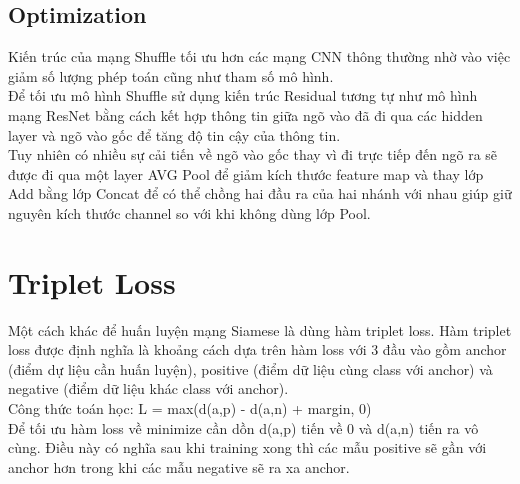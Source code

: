 \documentclass[11pt,a4paper]{article}
\begin{document}
	\subsection{Optimization}
	Kiến trúc của mạng Shuffle tối ưu hơn các mạng CNN thông thường nhờ vào việc giảm số lượng phép toán cũng như tham số mô hình.\\
	Để tối ưu mô hình Shuffle sử dụng kiến trúc Residual tương tự như mô hình mạng ResNet bằng cách kết hợp thông tin giữa ngõ vào đã đi qua các hidden layer và ngõ vào gốc để tăng độ tin cậy của thông tin.\\
	Tuy nhiên có nhiều sự cải tiến về ngõ vào gốc thay vì đi trực tiếp đến ngõ ra sẽ được đi qua một layer AVG Pool để giảm kích thước feature map và thay lớp Add bằng lớp Concat để có thể chồng hai đầu ra của hai nhánh với nhau giúp giữ nguyên kích thước channel so với khi không dùng lớp Pool.
	\section{Triplet Loss}
	Một cách khác để huấn luyện mạng Siamese là dùng hàm triplet loss.
	Hàm triplet loss được định nghĩa là khoảng cách dựa trên hàm loss với 3 đầu vào gồm anchor (điểm dự liệu cần huấn luyện), positive (điểm dữ liệu cùng class với anchor) và negative (điểm dữ liệu khác class với anchor).\\
	Công thức toán học: L = max(d(a,p) - d(a,n) + margin, 0) \\
	Để tối ưu hàm loss về minimize cần dồn d(a,p) tiến về 0 và d(a,n) tiến ra vô cùng. Điều này có nghĩa sau khi training xong thì các mẫu positive sẽ gần với anchor hơn trong khi các mẫu negative sẽ ra xa anchor.
\end{document}
